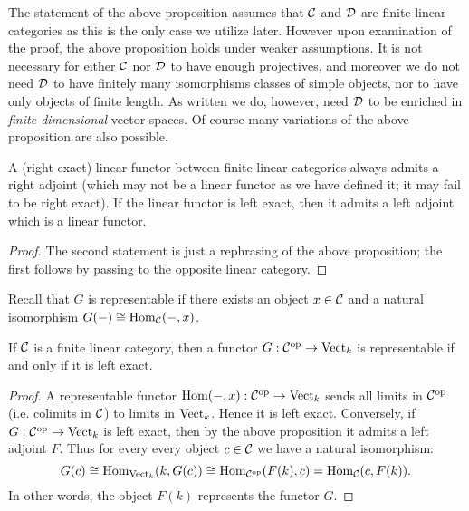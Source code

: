 \documentclass{amsart}
\begin{document}
\begin{remark}
	The statement of the above proposition assumes that $\mathcal C$ and $\mathcal D$ are finite linear categories as this is the only case we utilize later. However upon examination of the proof, the above proposition holds under weaker assumptions. It is not necessary for either $\mathcal C$ nor $\mathcal D$ to have enough projectives, and moreover we do not need $\mathcal D$ to have finitely many isomorphisms classes of simple objects, nor to have only objects of finite length. As written we do, however, need $\mathcal D$ to be enriched in {\em finite dimensional} vector spaces. Of course many variations of the above proposition are also possible. 
\end{remark}

\begin{corollary}
	A (right exact) linear functor between finite linear categories always admits a right adjoint (which may not be a linear functor as we have defined it; it may fail to be right exact). If the linear functor is left exact, then it admits a left adjoint which is a linear functor. 
\end{corollary}

\begin{proof}
	The second statement is just a rephrasing of the above proposition; the first follows by passing to the opposite linear category.  
\end{proof}

\noindent Recall that $G$ is representable if there exists an object $x \in \mathcal C$ and a natural isomorphism $G(-) \cong \operatorname{Hom}_{\mathcal C}(-, x)$. 


\begin{corollary}
If $\mathcal C$ is a finite linear category, then a functor $G: \mathcal C^\textrm{op} \to \mathrm{Vect}_k$ is representable if and only if it is left exact. 
\end{corollary}

\begin{proof}
	A representable functor $\operatorname{Hom}(-, x):\mathcal C^\text{op} \to \mathrm{Vect}_k$ sends all limits in $\mathcal C^\text{op}$ (i.e. colimits in $\mathcal C$) to limits in $\mathrm{Vect}_k$. Hence it is left exact. 
%
%		
Conversely, if $G: \mathcal C^\text{op} \to \mathrm{Vect}_k$ is left exact, then by the above proposition it admits a left adjoint $F$. Thus for every every object $c \in \mathcal C$ we have a natural isomorphism:
	\begin{equation*}
		G(c) \cong \operatorname{Hom}_{\mathrm{Vect}_k}( k, G(c)) \cong \operatorname{Hom}_{\mathcal C^{\mathrm{op}}}( F(k), c) = \operatorname{Hom}_{\mathcal C}(c, F(k) ).
	\end{equation*}
	In other words,  the object $F(k)$ represents the functor $G$. 
\end{proof}
\end{document}

